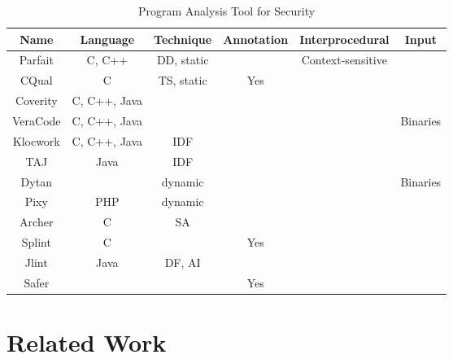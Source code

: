 \newcommand{\parfait}{\texttt{Parfait}\xspace}
\newcommand{\cqual}{\texttt{CQual}\xspace}
\newcommand{\dytan}{\texttt{Dytan}\xspace}
\newcommand{\pixy}{\texttt{Pixy}\xspace}
\newcommand{\ardilla}{\texttt{ARDILLA}\xspace}

\newcommand{\datalog}{\texttt{Datalog}\xspace}
\newcommand{\bddbddb}{\texttt{bddbddb}\xspace}
\newcommand{\pql}{\texttt{PQL}\xspace}

\begin{table*}[!htbp]
\centering
\begin{tabular}{|c|c|c|c|c|c|}
\hline
{\bf Name} & {\bf Language}	& {\bf Technique } &	{\bf Annotation}	& {\bf Interprocedural} & {\bf Input}  \\ \hline
Parfait	    &	C, C++		&	DD,	static		&						&	Context-sensitive	&				\\
CQual	 	&	C			&	TS, static		&	Yes					&						&   			\\
Coverity	& C, C++, Java  &					&						&						&				\\
VeraCode	& C, C++, Java  &					&						&						&	Binaries	\\
Klocwork	& C, C++, Java  &	IDF				&						&						&				\\
TAJ			& Java  		&	IDF				&						&						&				\\
Dytan		&				&	dynamic			&						&						&	Binaries	\\
Pixy		&	PHP			&	dynamic			&						&						&				\\
Archer	 	&	C			&	SA				&						&						&   			\\
Splint		&	C			&					&	Yes					&						&				\\
Jlint		&	Java		&	DF, AI			&						&						&				\\
Safer		&				&					&	Yes					&						&				\\ \hline
\end{tabular}\caption{Program Analysis Tool for Security}
\end{table*}

\section{Related Work}\label{sec:related}

